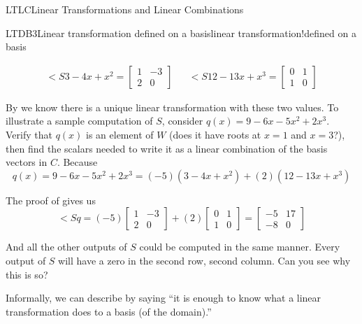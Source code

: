 \begin{subsect}{LTLC}{Linear Transformations and Linear Combinations}
\begin{example}{LTDB3}{Linear transformation defined on a basis}{linear transformation!defined on a basis}
\begin{para}
%
\begin{align*}
\lt{S}{3-4x+x^2}=\begin{bmatrix}1&-3\\2&0\end{bmatrix}&&
\lt{S}{12-13x+x^3}=\begin{bmatrix}0&1\\1&0\end{bmatrix}
\end{align*}
\end{para}
%
\begin{para}By  we know there is a unique linear transformation with these two values.  To illustrate a sample computation of $S$, consider $q(x)=9-6x-5x^2+2x^3$.  Verify that $q(x)$ is an element of $W$ (does it have roots at $x=1$ and $x=3$?), then find the scalars needed to write it as a linear combination of the basis vectors in $C$.  Because
%
\begin{equation*}
q(x)=9-6x-5x^2+2x^3=(-5)(3-4x+x^2)+(2)(12-13x+x^3)
\end{equation*}
\end{para}
%
\begin{para}The proof of  gives us
%
\begin{equation*}
\lt{S}{q}=(-5)\begin{bmatrix}1&-3\\2&0\end{bmatrix}
+
(2)\begin{bmatrix}0&1\\1&0\end{bmatrix}
=
\begin{bmatrix}-5&17\\-8&0\end{bmatrix}
\end{equation*}
\end{para}
%
\begin{para}And all the other outputs of $S$ could be computed in the same manner.  Every output of $S$ will have a zero in the second row, second column.  Can you see why this is so?\end{para}
%
\end{example}
%
\begin{para}Informally, we can describe  by saying ``it is enough to know what a linear transformation does to a basis (of the domain).''\end{para}
%
%
\end{subsect}
